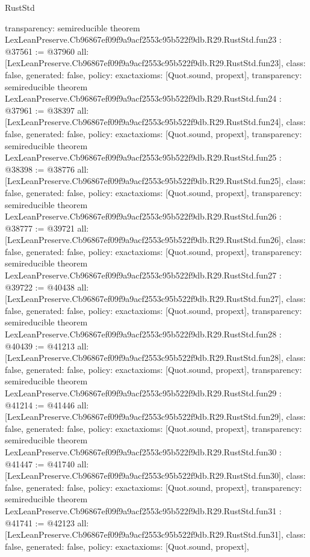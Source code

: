 \begin{lexlean}{RustStd}
\begin{coremodule}
{  transparency: semireducible
}
theorem LexLeanPreserve.Cb96867ef09f9a9acf2553c95b522f9db.R29.RustStd.fun23 : @37561 := @37960 {
  all: [LexLeanPreserve.Cb96867ef09f9a9acf2553c95b522f9db.R29.RustStd.fun23],
  class: false,
  generated: false,
  policy: exact{axioms: [Quot.sound, propext]},
  transparency: semireducible
}
theorem LexLeanPreserve.Cb96867ef09f9a9acf2553c95b522f9db.R29.RustStd.fun24 : @37961 := @38397 {
  all: [LexLeanPreserve.Cb96867ef09f9a9acf2553c95b522f9db.R29.RustStd.fun24],
  class: false,
  generated: false,
  policy: exact{axioms: [Quot.sound, propext]},
  transparency: semireducible
}
theorem LexLeanPreserve.Cb96867ef09f9a9acf2553c95b522f9db.R29.RustStd.fun25 : @38398 := @38776 {
  all: [LexLeanPreserve.Cb96867ef09f9a9acf2553c95b522f9db.R29.RustStd.fun25],
  class: false,
  generated: false,
  policy: exact{axioms: [Quot.sound, propext]},
  transparency: semireducible
}
theorem LexLeanPreserve.Cb96867ef09f9a9acf2553c95b522f9db.R29.RustStd.fun26 : @38777 := @39721 {
  all: [LexLeanPreserve.Cb96867ef09f9a9acf2553c95b522f9db.R29.RustStd.fun26],
  class: false,
  generated: false,
  policy: exact{axioms: [Quot.sound, propext]},
  transparency: semireducible
}
theorem LexLeanPreserve.Cb96867ef09f9a9acf2553c95b522f9db.R29.RustStd.fun27 : @39722 := @40438 {
  all: [LexLeanPreserve.Cb96867ef09f9a9acf2553c95b522f9db.R29.RustStd.fun27],
  class: false,
  generated: false,
  policy: exact{axioms: [Quot.sound, propext]},
  transparency: semireducible
}
theorem LexLeanPreserve.Cb96867ef09f9a9acf2553c95b522f9db.R29.RustStd.fun28 : @40439 := @41213 {
  all: [LexLeanPreserve.Cb96867ef09f9a9acf2553c95b522f9db.R29.RustStd.fun28],
  class: false,
  generated: false,
  policy: exact{axioms: [Quot.sound, propext]},
  transparency: semireducible
}
theorem LexLeanPreserve.Cb96867ef09f9a9acf2553c95b522f9db.R29.RustStd.fun29 : @41214 := @41446 {
  all: [LexLeanPreserve.Cb96867ef09f9a9acf2553c95b522f9db.R29.RustStd.fun29],
  class: false,
  generated: false,
  policy: exact{axioms: [Quot.sound, propext]},
  transparency: semireducible
}
theorem LexLeanPreserve.Cb96867ef09f9a9acf2553c95b522f9db.R29.RustStd.fun30 : @41447 := @41740 {
  all: [LexLeanPreserve.Cb96867ef09f9a9acf2553c95b522f9db.R29.RustStd.fun30],
  class: false,
  generated: false,
  policy: exact{axioms: [Quot.sound, propext]},
  transparency: semireducible
}
theorem LexLeanPreserve.Cb96867ef09f9a9acf2553c95b522f9db.R29.RustStd.fun31 : @41741 := @42123 {
  all: [LexLeanPreserve.Cb96867ef09f9a9acf2553c95b522f9db.R29.RustStd.fun31],
  class: false,
  generated: false,
  policy: exact{axioms: [Quot.sound, propext]},
}
\end{coremodule}
\end{lexlean}
